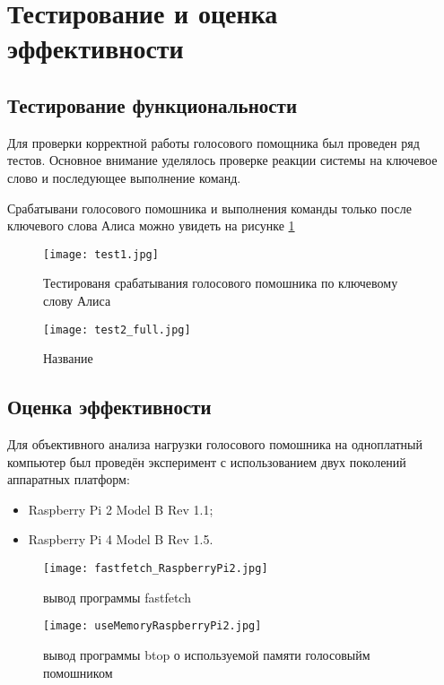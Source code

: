 \section{Тестирование и оценка эффективности}

\subsection{Тестирование функциональности}
Для проверки корректной работы голосового помощника был проведен ряд тестов. Основное внимание уделялось проверке реакции системы на ключевое слово и последующее выполнение команд. 

Срабатывани голосового помошника и выполнения команды только после ключевого слова Алиса можно увидеть на рисунке \ref{fig:test1}

\begin{figure}[H]
	\centering
	\texttt{[image: test1.jpg]}
	\caption{Тестированя срабатывания голосового помошника по ключевому слову Алиса}
	\label{fig:test1}
\end{figure}

\begin{figure}[H]
	\centering
	\texttt{[image: test2\_full.jpg]}
	\caption{Название }
	\label{fig:test2}
\end{figure}

\subsection{Оценка эффективности}

Для объективного анализа нагрузки голосового помошника на одноплатный компьютер был проведён эксперимент с использованием двух поколений аппаратных платформ:
\begin{itemize}
	\item Raspberry Pi 2 Model B Rev 1.1;
	\item Raspberry Pi 4 Model B Rev 1.5.
\end{itemize}

\begin{figure}[H]
	\centering
	\texttt{[image: fastfetch\_RaspberryPi2.jpg]}
	\caption{вывод программы fastfetch}
	\label{fig:fastfetch_RaspberryPi2}
\end{figure}


\begin{figure}[H]
	\centering
	\texttt{[image: useMemoryRaspberryPi2.jpg]}
	\caption{вывод программы btop о используемой памяти голосовыйм помошником}
	\label{fig:useMemoryRaspberryPi2}
\end{figure}

